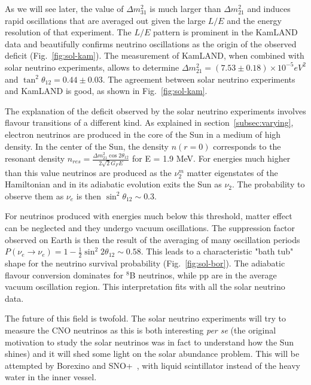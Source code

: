 As we will see later, the value of $\Delta m^2_{31}$ is much larger than $\Delta m^2_{21}$ and induces rapid oscillations that are averaged out given the large $L/E$ and the energy resolution of that experiment. The $L/E$ pattern is prominent in the KamLAND data and beautifully confirms neutrino oscillations as the origin of the observed deficit (Fig.~\ref{fig:sol-kam}). The measurement of KamLAND, when combined with solar neutrino experiments, allows to determine $\Delta m^2_{21} = (7.53 \pm 0.18) \times 10^{-5} eV^2$ and $\tan^2 \theta_{12} = 0.44 \pm 0.03$. The agreement between solar neutrino experiments and KamLAND is good, as shown in Fig.~\ref{fig:sol-kam}.

The explanation of the deficit observed by the solar neutrino experiments involves flavour transitions of a different kind. As explained in section~\ref{subsec:varying}, electron neutrinos are produced in the core of the Sun in a medium of high density. 
In the center of the Sun, the density $n(r=0)$ corresponds to the resonant density $ n_{res}= \frac{\Delta m^2_{21} \cos 2 \theta_{12}}{ 2 \sqrt{2}G_F E}$ for E = 1.9 MeV. For energies much higher than this value
neutrinos are produced as the $ \nu^m_2$ matter eigenstates of the Hamiltonian and in its adiabatic evolution exits the Sun as $\nu_2$. The probability to observe them as $\nu_e$ is then $\sin^2 \theta_{12} \sim 0.3$. 

For neutrinos produced with energies much below this threshold, matter effect can be neglected and they undergo vacuum oscillations. The suppression factor observed on Earth is then the result of the averaging of many oscillation periods    
$ P({\nu}_e \rightarrow {\nu}_e ) = 1 - \frac{1}{2} \sin^2 2 \theta_{12} \sim 0.58$. 
This leads to a characteristic "bath tub" shape for the neutrino survival probability (Fig.~\ref{fig:sol-bor}). The adiabatic flavour conversion dominates for $^8$B neutrinos, while pp are in the average vacuum oscillation region. 
This interpretation fits with all the solar neutrino data. 

The future of this field is twofold. The solar neutrino experiments will try to measure the CNO neutrinos as this is both interesting {\it per se} (the original motivation to study the solar neutrinos was in fact to understand how the Sun shines) and it will shed some light on the solar abundance problem. This will be attempted by Borexino and SNO+~\cite{snoplus}, with liquid scintillator instead of the heavy water in the inner vessel. 

